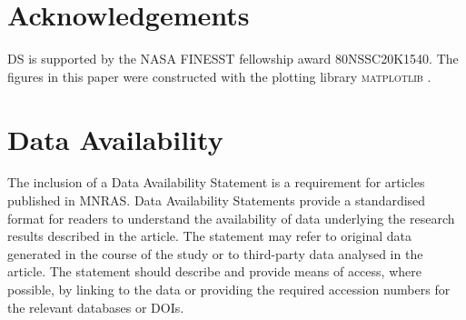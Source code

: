 \documentclass[fleqn,usenatbib]{mnras}
\begin{document}
\section*{Acknowledgements}

DS is supported by the NASA FINESST fellowship award 80NSSC20K1540. The figures in this paper were constructed with the plotting library \textsc{matplotlib} \citep{matplotlib}.

\section*{Data Availability}

 
The inclusion of a Data Availability Statement is a requirement for articles published in MNRAS. Data Availability Statements provide a standardised format for readers to understand the availability of data underlying the research results described in the article. The statement may refer to original data generated in the course of the study or to third-party data analysed in the article. The statement should describe and provide means of access, where possible, by linking to the data or providing the required accession numbers for the relevant databases or DOIs.






\typeout{}










\bsp	%
\label{lastpage}
\end{document}
